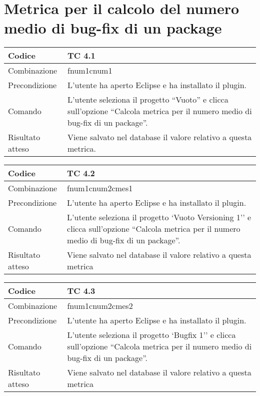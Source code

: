 \clearpage

\section{Metrica per il calcolo del numero medio di bug-fix di un package}

\begin{table}[ht]
\begin{tabular}{|p{3cm}|p{9cm}|}
\hline
\cellcolor{lightgray}Codice				& TC 4.1								\\
\hline
\cellcolor{lightgray}Combinazione		& fnum1cnum1									\\
\hline
\cellcolor{lightgray}Precondizione		& L'utente ha aperto Eclipse e ha installato il plugin.		\\
\hline
\cellcolor{lightgray}Comando			& L'utente seleziona il progetto ``Vuoto''  e clicca sull'opzione ``Calcola metrica per il numero medio di bug-fix di un package''.	\\
\hline
\cellcolor{lightgray}Risultato atteso	& Viene salvato nel database il valore relativo a questa metrica.\\
\hline
\end{tabular}
\end{table}

\begin{table}[ht]
\begin{tabular}{|p{3cm}|p{9cm}|}
\hline
\cellcolor{lightgray}Codice				& TC 4.2								\\
\hline
\cellcolor{lightgray}Combinazione		& fnum1cnum2cmes1 									\\
\hline
\cellcolor{lightgray}Precondizione		& L'utente ha aperto Eclipse e ha installato il plugin.				\\
\hline
\cellcolor{lightgray}Comando			& L'utente seleziona il progetto `Vuoto Versioning 1''  e clicca sull'opzione ``Calcola metrica per il numero medio di bug-fix di un package''.	\\
\hline
\cellcolor{lightgray}Risultato atteso	& Viene salvato nel database il valore relativo a questa metrica	\\
\hline
\end{tabular}
\end{table}

\begin{table}[ht]
\begin{tabular}{|p{3cm}|p{9cm}|}
\hline
\cellcolor{lightgray}Codice				& TC 4.3								\\
\hline
\cellcolor{lightgray}Combinazione		& fnum1cnum2cmes2									\\
\hline
\cellcolor{lightgray}Precondizione		& L'utente ha aperto Eclipse e ha installato il plugin.					\\
\hline
\cellcolor{lightgray}Comando			& L'utente seleziona il progetto `Bugfix 1''  e clicca sull'opzione ``Calcola metrica per il numero medio di bug-fix di un package''.	\\
\hline
\cellcolor{lightgray}Risultato atteso	& Viene salvato nel database il valore relativo a questa metrica	\\
\hline
\end{tabular}
\end{table}

